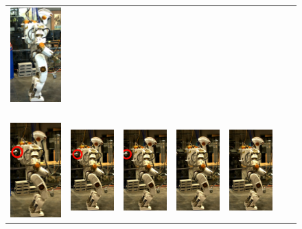 \documentclass[letterpaper, 10 pt, conference]{ieeeconf}  %
\begin{document}
\begin{figure}[h]
\begin{tabular}{ccccccc}
    \includegraphics[width=0.84in]{val7z_30} ~\\[2ex]
     \includegraphics[width=0.84in]{val1dr_C} &
    \includegraphics[width=0.84in]{val2dr_30} &
    \includegraphics[width=0.84in]{val3dr_30} &
    \includegraphics[width=0.84in]{val4d_30} &
    \includegraphics[width=0.84in]{val5d_30} &

\end{tabular}
\end{figure}
\end{document}
